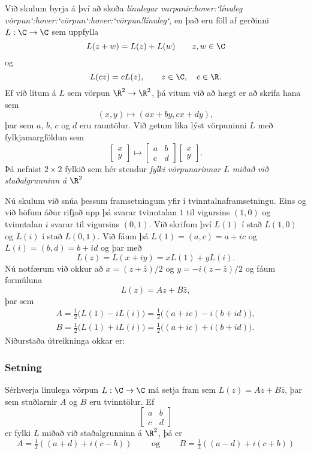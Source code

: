 Við skulum  byrja á því að skoða {\it  línulegar
varpanir:hover:`línuleg vörpun`:hover:`vörpun`:hover:`vörpun!línuleg`}, en það eru
föll af gerðinni $L:\C\to \C$ sem uppfylla
$$
L(z+w)=L(z)+L(w) \qquad z,w\in \C
$$
og
$$
L(cz)=cL(z), \qquad z\in \C, \quad c\in \R.
$$
Ef við lítum á $L$ sem vörpun $\R^2\to \R^2$, þá vitum við að hægt er að
skrifa hana sem
\begin{equation*}
(x,y)\mapsto (ax+by, cx+dy),
\end{equation*}
þar sem $a$, $b$,  $c$ og $d$ eru rauntölur.  Við getum líka lýst
vörpuninni $L$ með fylkjamargföldun sem 
\begin{equation*}
\left[\begin{matrix} x\\ y\end{matrix} \right]\mapsto
\left[\begin{matrix} a & b\\ c & d\end{matrix} \right]
\left[\begin{matrix} x\\ y\end{matrix} \right].
\end{equation*}
Þá nefnist $2\times 2$ fylkið sem hér stendur 
{\it fylki vörpunarinnar $L$ miðað við staðalgrunninn á $\R^2$}

Nú skulum við snúa þessum framsetningum yfir í tvinntalnaframsetningu.
Eins og við höfum áður rifjað upp þá svarar
tvinntalan $1$ til vigursins  $(1,0)$ og tvinntalan $i$ svarar til
vigursins $(0,1)$.  Við skrifum því $L(1)$ í stað $L(1,0)$ og $L(i)$ í
stað $L(0,1)$.  Við fáum þá $L(1)=(a,c)=a+ic$ og
$L(i)=(b,d)=b+id$ og þar með
$$
L(z)=L(x+iy)=xL(1)+yL(i).
$$
Nú notfærum við okkur að $x=(z+\bar z)/2$ og $y=-i(z-\bar
z)/2$ og fáum formúluna
\begin{equation*}
L(z)=Az+B\bar z,
\end{equation*}
þar sem
\begin{align*}
A=\tfrac 12\big(L(1)-iL(i)\big)
=\tfrac 12\big((a+ic)-i(b+id)\big),\\
B=\tfrac 12\big(L(1)+iL(i)\big)
=\tfrac 12\big((a+ic)+i(b+id)\big).
\end{align*}
Niðurstaða útreikninga okkar er:

\subsubsection{Setning}  Sérhverja línulega vörpun $L:\C\to\C$
má setja fram sem $L(z)=Az+B\bar z$, þar sem stuðlarnir
$A$ og $B$ eru tvinntölur.  Ef 
$$
\left[\begin{matrix} a & b\\ c & d\end{matrix} \right]
$$
er fylki $L$ miðað við staðalgrunninn á $\R^2$, þá er
$$
A=\tfrac 12((a+d)+i(c-b)) \qquad \text{ og } \qquad
B= \tfrac 12((a-d)+i(c+b))
$$



